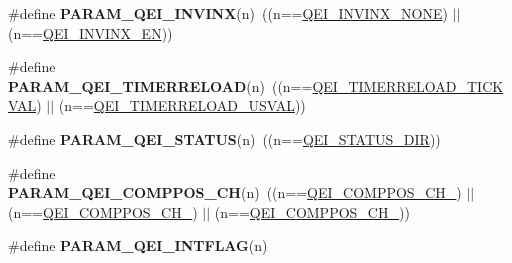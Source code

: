\begin{DoxyCompactItemize}
\item 
\hypertarget{group___q_e_i___private___macros_gad5729b0e119000954dbeb33c0957ac61}{\#define {\bfseries \-P\-A\-R\-A\-M\-\_\-\-Q\-E\-I\-\_\-\-I\-N\-V\-I\-N\-X}(n)~((n==\hyperlink{group___q_e_i___public___macros_gaf5a7b0a1a513675800273f51b3fd2e4b}{\-Q\-E\-I\-\_\-\-I\-N\-V\-I\-N\-X\-\_\-\-N\-O\-N\-E}) $|$$|$ (n==\hyperlink{group___q_e_i___public___macros_ga0f2f9afd7f46adf874e7627968f9759e}{\-Q\-E\-I\-\_\-\-I\-N\-V\-I\-N\-X\-\_\-\-E\-N}))}\label{group___q_e_i___private___macros_gad5729b0e119000954dbeb33c0957ac61}

\item 
\hypertarget{group___q_e_i___private___macros_gaabdf126e117ce6043928ebb09e1a0f1b}{\#define {\bfseries \-P\-A\-R\-A\-M\-\_\-\-Q\-E\-I\-\_\-\-T\-I\-M\-E\-R\-R\-E\-L\-O\-A\-D}(n)~((n==\hyperlink{group___q_e_i___public___macros_ga1b5cb4e5755fbcfe46c1743302ea218f}{\-Q\-E\-I\-\_\-\-T\-I\-M\-E\-R\-R\-E\-L\-O\-A\-D\-\_\-\-T\-I\-C\-K\-V\-A\-L}) $|$$|$ (n==\hyperlink{group___q_e_i___public___macros_ga8de8a4acc16db48fe26ac872dda2d787}{\-Q\-E\-I\-\_\-\-T\-I\-M\-E\-R\-R\-E\-L\-O\-A\-D\-\_\-\-U\-S\-V\-A\-L}))}\label{group___q_e_i___private___macros_gaabdf126e117ce6043928ebb09e1a0f1b}

\item 
\hypertarget{group___q_e_i___private___macros_ga7c92ddfe9fe9f7c06114fda40370af91}{\#define {\bfseries \-P\-A\-R\-A\-M\-\_\-\-Q\-E\-I\-\_\-\-S\-T\-A\-T\-U\-S}(n)~((n==\hyperlink{group___q_e_i___public___macros_gab1151c4e822d3c8e9145d8ff84009aa2}{\-Q\-E\-I\-\_\-\-S\-T\-A\-T\-U\-S\-\_\-\-D\-I\-R}))}\label{group___q_e_i___private___macros_ga7c92ddfe9fe9f7c06114fda40370af91}

\item 
\hypertarget{group___q_e_i___private___macros_ga84f9d3798c3bc7429136807b93f5dcec}{\#define {\bfseries \-P\-A\-R\-A\-M\-\_\-\-Q\-E\-I\-\_\-\-C\-O\-M\-P\-P\-O\-S\-\_\-\-C\-H}(n)~((n==\hyperlink{group___q_e_i___public___macros_ga72e128cb0a1b99f517999bf0fa25f613}{\-Q\-E\-I\-\_\-\-C\-O\-M\-P\-P\-O\-S\-\_\-\-C\-H\-\_}) $|$$|$ (n==\hyperlink{group___q_e_i___public___macros_ga11e61fbcc2da19150d4243b70a45c567}{\-Q\-E\-I\-\_\-\-C\-O\-M\-P\-P\-O\-S\-\_\-\-C\-H\-\_}) $|$$|$ (n==\hyperlink{group___q_e_i___public___macros_ga7361286e4cf215d251bd353cc78b3cf3}{\-Q\-E\-I\-\_\-\-C\-O\-M\-P\-P\-O\-S\-\_\-\-C\-H\-\_}))}\label{group___q_e_i___private___macros_ga84f9d3798c3bc7429136807b93f5dcec}

\item 
\#define {\bfseries \-P\-A\-R\-A\-M\-\_\-\-Q\-E\-I\-\_\-\-I\-N\-T\-F\-L\-A\-G}(n)
\end{DoxyCompactItemize}


